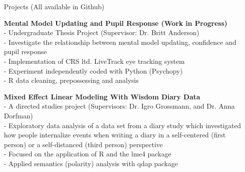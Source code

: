 \documentclass{resume} %
\begin{document}
\begin{rSection}{Projects (All available in Github)}

	{\bf Mental Model Updating and Pupil Response (Work in Progress)}
	\\- Undergraduate Thesis Project (Supervisor: Dr. Britt Anderson)
	\\- Investigate the relationship between mental model updating, confidence and pupil response
	\\- Implementation of CRS ltd. LiveTrack eye tracking system
	\\- Experiment independently coded with Python (Psychopy)
	\\- R data cleaning, prepossessing and analysis
	
	{\bf Mixed Effect Linear Modeling With Wisdom Diary Data}
	\\- A directed studies project (Supervisors: Dr. Igro Grossmann, and Dr. Anna Dorfman)
	\\- Exploratory data analysis of a data set from a diary study which investigated how people internalize events when writing a diary in a self-centered (first person) or a self-distanced (third person) perspective
	\\- Focused on the application of R and the lme4 package
	\\- Applied semantics (polarity) analysis with qdap package

\end{rSection}
\end{document}
